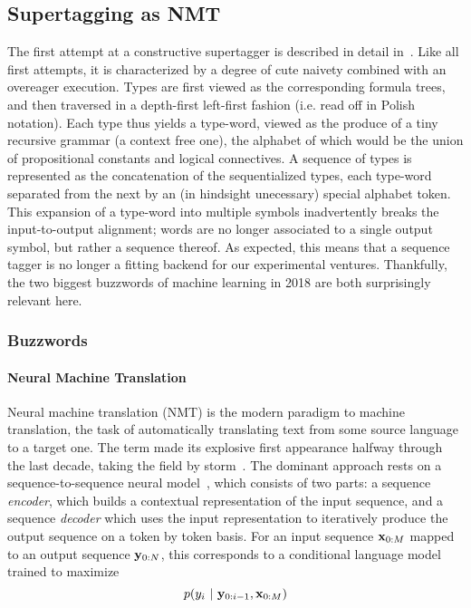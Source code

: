 \subsection{Supertagging as NMT}
\label{subsection:snmt}
The first attempt at a constructive supertagger is described in detail in~\citet{kogkalidis-etal-2019-constructive}.
Like all first attempts, it is characterized by a degree of cute naivety combined with an overeager execution.
Types are first viewed as the corresponding formula trees, and then traversed in a depth-first left-first fashion (i.e. read off in Polish notation).
Each type thus yields a type-word, viewed as the produce of a tiny recursive grammar (a context free one), the alphabet of which would be the union of propositional constants and logical connectives.
A sequence of types is represented as the concatenation of the sequentialized types, each type-word separated from the next by an (in hindsight unecessary) special alphabet token.
This expansion of a type-word into multiple symbols inadvertently breaks the input-to-output alignment; words are no longer associated to a single output symbol, but rather a sequence thereof.
As expected, this means that a sequence tagger is no longer a fitting backend for our experimental ventures.
Thankfully, the two biggest buzzwords of machine learning in 2018 are both surprisingly relevant here.

\subsubsection{Buzzwords}
\paragraph{Neural Machine Translation} Neural machine translation (NMT) is the modern paradigm to machine translation, the task of automatically translating text from some source language to a target one.
The term made its explosive first appearance halfway through the last decade, taking the field by storm~\cite{kalchbrenner2013recurrent,cho2014learning,bahdanau2015neural}.
The dominant approach rests on a sequence-to-sequence neural model~\cite{cho2014learning,NIPS2014_a14ac55a}, which consists of two parts: a sequence \textit{encoder}, which builds a contextual representation of the input sequence, and a sequence \textit{decoder} which uses the input representation to iteratively produce the output sequence on a token by token basis.
For an input sequence $\mathbf{x}_{0:M}$ mapped to an output sequence $\mathbf{y}_{0:N}$, this corresponds to a conditional language model trained to maximize
\begin{equation}
	p(y_i \ | \ \seq{y}{0:i-1},\seq{x}{0:M})
\end{equation}

